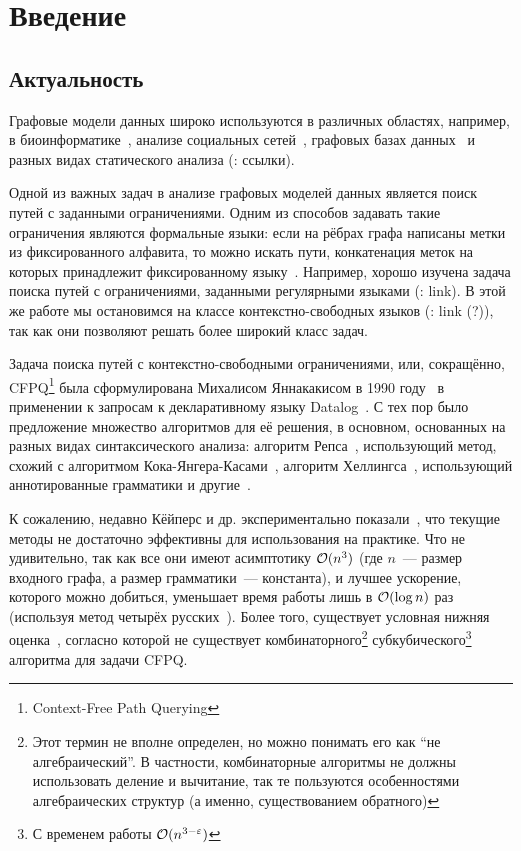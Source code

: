 \section*{Введение}


\subsection*{Актуальность}

Графовые модели данных широко используются в различных областях, например, в биоинформатике~\cite{Sevon08}, анализе социальных сетей~\cite{Zarrinkalam14, Chaudhary16}, графовых базах данных~\cite{Medeiros18,Yannakakis1990} и разных видах статического анализа (\TODO: ссылки). 

Одной из важных задач в анализе графовых моделей данных является поиск путей с заданными ограничениями. Одним из способов задавать такие ограничения являются формальные языки: если на рёбрах графа написаны метки из фиксированного алфавита, то можно искать пути, конкатенация меток на которых принадлежит фиксированному языку~\cite{Barrett00}. Например, хорошо изучена задача поиска путей с ограничениями, заданными регулярными языками (\TODO: link). В этой же работе мы остановимся на классе контекстно-свободных языков (\TODO: link (?)), так как они позволяют решать более широкий класс задач.

Задача поиска путей с контекстно-свободными ограничениями, или, сокращённо, CFPQ\footnote{Context-Free Path Querying} была сформулирована Михалисом Яннакакисом в 1990 году~\cite{Yannakakis1990} в применении к запросам к декларативному языку Datalog~\cite{DatalogWiki, Ceri1989}. С тех пор было предложение множество алгоритмов для её решения, в основном, основанных на разных видах синтаксического анализа: алгоритм Репса~\cite{Reps97}, использующий метод, схожий с алгоритмом Кока-Янгера-Касами~\cite{Younger1967},
 алгоритм Хеллингса~\cite{Hellings15}, использующий аннотированные грамматики и другие~\cite{Santos18,Azimov18, Medeiros18, Orachev20, Chaudhuri08}. 

 К сожалению, недавно Кёйперс и др. экспериментально показали~\cite{Kuijpers19}, что текущие методы не достаточно эффективны для использования на практике. Что не удивительно, так как все они имеют асимптотику $\mathcal{O}(n^3)$ (где $n$~--- размер входного графа, а размер грамматики~--- константа), и лучшее ускорение, которого можно добиться, уменьшает время работы лишь в $\mathcal{O}(\log n)$ раз~\cite{Chaudhuri06} (используя метод четырёх русских~\cite{Arlazarov70}). Более того, существует условная нижняя оценка~\cite{Heintze1997,Chatterjee17}, согласно которой не существует комбинаторного\footnote{Этот термин не вполне определен, но можно понимать его как ``не алгебраический''. В частности, комбинаторные алгоритмы не должны использовать деление и вычитание, так те пользуются особенностями алгебраических структур (а именно, существованием обратного)} субкубического\footnote{С временем работы $\mathcal{O}(n^{3 - \varepsilon})$} алгоритма для задачи CFPQ.

